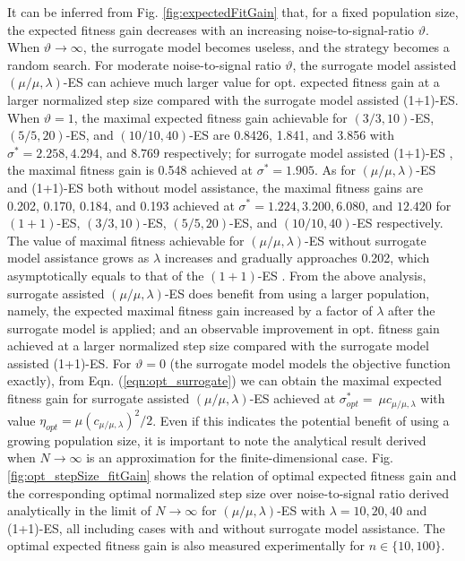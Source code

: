 
It can be inferred from Fig. \ref{fig:expectedFitGain} that, for a fixed population size, the expected fitness gain decreases with an increasing noise-to-signal-ratio $\vartheta$. When $\vartheta \rightarrow \infty$, the surrogate model becomes useless, and the strategy becomes a random search. For moderate noise-to-signal ratio $\vartheta$, the surrogate model assisted $(\mu/\mu,\lambda)$-ES can achieve much larger value for opt. expected fitness gain at a larger normalized step size compared with the surrogate model assisted (1+1)-ES. When $\vartheta = 1$, the maximal expected fitness gain achievable for $(3/3,10)$-ES, $(5/5,20)$-ES, and $(10/10,40)$-ES are 0.8426, 1.841, and 3.856 with $\sigma^*=2.258,4.294$, and $8.769$ respectively; for surrogate model assisted (1+1)-ES \cite{DBLP:conf/ppsn/KayhaniA18}, the maximal fitness gain is 0.548 achieved at $\sigma^* = 1.905$. As for $(\mu/\mu,\lambda)$-ES and (1+1)-ES both without model assistance, the maximal fitness gains are 0.202, 0.170, 0.184, and 0.193 achieved at $\sigma^*=1.224,3.200,6.080$, and $12.420$ for $(1+1)$-ES, $(3/3,10)$-ES, $(5/5,20)$-ES, and $(10/10,40)$-ES respectively. The value of maximal fitness achievable for $(\mu/\mu,\lambda)$-ES without surrogate model assistance grows as $\lambda$ increases and gradually approaches 0.202, which asymptotically equals to that of the $(1+1)$-ES \cite{Beyer:1995:TTE:1326683.1326688}. From the above analysis, surrogate assisted $(\mu/\mu,\lambda)$-ES does benefit from using a larger population, namely, the expected maximal fitness gain increased by a factor of $\lambda$ after the surrogate model is applied; and an observable improvement in opt. fitness gain achieved at a larger normalized step size compared with the surrogate model assisted (1+1)-ES. For $\vartheta=0$ (the surrogate model models the objective function exactly), from Eqn. (\ref{eqn:opt_surrogate}) we can obtain the maximal expected fitness gain for surrogate assisted $(\mu/\mu,\lambda)$-ES achieved at $\sigma^*_{opt} = \ \mu c_{\mu / \mu, \lambda}$ with value $\eta_{opt} =  \mu (c_{\mu / \mu, \lambda})^2/2$. Even if this indicates the potential benefit of using a growing population size, it is important to note the analytical result derived when $N \rightarrow \infty$ is an approximation for the finite-dimensional case. Fig. \ref{fig:opt_stepSize_fitGain} shows the relation of optimal expected fitness gain and the corresponding optimal normalized step size over noise-to-signal ratio derived analytically in the limit of $N \rightarrow \infty$ for $(\mu/\mu,\lambda)$-ES with $\lambda=10,20,40$ and (1+1)-ES, all including cases with and without surrogate model assistance. The optimal expected fitness gain is also measured experimentally for $n \in \{10,100 \}$. 
   
